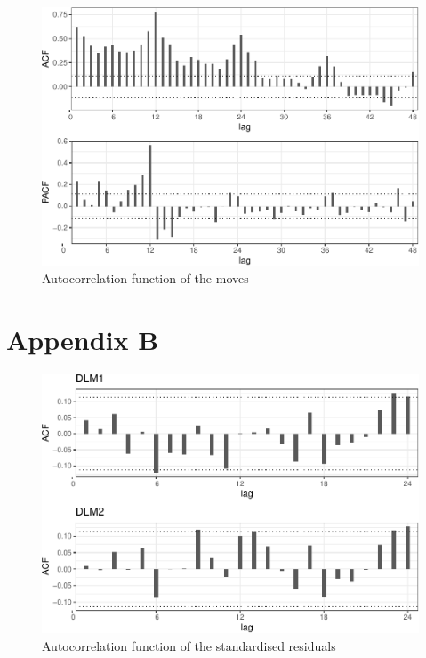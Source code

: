 \documentclass[]{article}
\begin{document}
\begin{figure}
\centering
\includegraphics{../figs/freq--autocorr-plot-1.pdf}
\caption{\label{fig:autocorr-plot}Autocorrelation function of the moves}
\end{figure}

\section{Appendix B}\label{appendix-b}

\begin{figure}
\centering
\includegraphics{../figs/freq--residual-autocorr-1.pdf}
\caption{\label{fig:residual-autocorr}Autocorrelation function of the
standardised residuals}
\end{figure}
\end{document}
